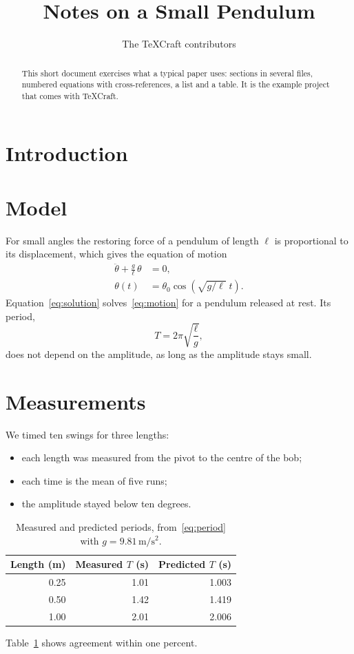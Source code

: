 \documentclass[11pt]{article}
\title{Notes on a Small Pendulum}
\author{The TeXCraft contributors}
\date{}
\begin{document}
\maketitle

\begin{abstract}
  This short document exercises what a typical paper uses: sections in several files,
  numbered equations with cross-references, a list and a table. It is the example
  project that comes with TeXCraft.
\end{abstract}

\section{Introduction}


\section{Model}
For small angles the restoring force of a pendulum of length $\ell$ is proportional
to its displacement, which gives the equation of motion
\begin{align}
  \ddot\theta + \frac{g}{\ell}\,\theta &= 0, \label{eq:motion}\\
  \theta(t) &= \theta_0 \cos\left(\sqrt{g/\ell}\;t\right). \label{eq:solution}
\end{align}
Equation~\eqref{eq:solution} solves~\eqref{eq:motion} for a pendulum released at rest.
Its period,
\begin{equation}
  T = 2\pi\sqrt{\frac{\ell}{g}},
  \label{eq:period}
\end{equation}
does not depend on the amplitude, as long as the amplitude stays small.

\section{Measurements}
We timed ten swings for three lengths:
\begin{itemize}
  \item each length was measured from the pivot to the centre of the bob;
  \item each time is the mean of five runs;
  \item the amplitude stayed below ten degrees.
\end{itemize}

\begin{table}[h]
  \centering
  \begin{tabular}{rrr}
    \toprule
    Length (m) & Measured $T$ (s) & Predicted $T$ (s) \\
    \midrule
    0.25 & 1.01 & 1.003 \\
    0.50 & 1.42 & 1.419 \\
    1.00 & 2.01 & 2.006 \\
    \bottomrule
  \end{tabular}
  \caption{Measured and predicted periods, from~\eqref{eq:period} with $g = 9.81\,\mathrm{m/s^2}$.}
  \label{tab:periods}
\end{table}

Table~\ref{tab:periods} shows agreement within one percent.
\end{document}
